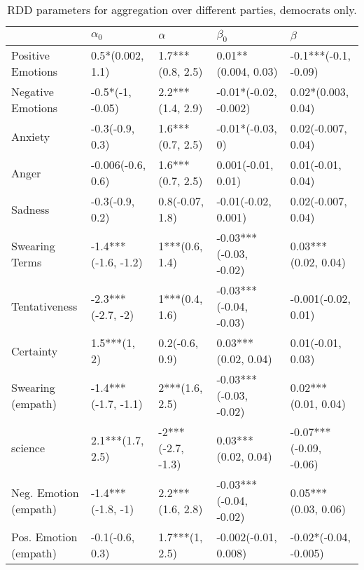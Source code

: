 \begin{table}[h]\centering
\begin{adjustbox}{width=\linewidth, center}
	\begin{tabular}{lllll}
	\toprule
	{} &           $\alpha_0$ &           $\alpha$ &               $\beta_0$ &                 $\beta$ \\
	\midrule
	Positive Emotions     &     0.5*(0.002, 1.1) &   1.7***(0.8, 2.5) &     0.01**(0.004, 0.03) &    -0.1***(-0.1, -0.09) \\
	Negative Emotions     &     -0.5*(-1, -0.05) &   2.2***(1.4, 2.9) &   -0.01*(-0.02, -0.002) &      0.02*(0.003, 0.04) \\
	Anxiety               &      -0.3(-0.9, 0.3) &   1.6***(0.7, 2.5) &        -0.01*(-0.03, 0) &      0.02(-0.007, 0.04) \\
	Anger                 &    -0.006(-0.6, 0.6) &   1.6***(0.7, 2.5) &      0.001(-0.01, 0.01) &       0.01(-0.01, 0.04) \\
	Sadness               &      -0.3(-0.9, 0.2) &    0.8(-0.07, 1.8) &     -0.01(-0.02, 0.001) &      0.02(-0.007, 0.04) \\
	Swearing Terms        &  -1.4***(-1.6, -1.2) &     1***(0.6, 1.4) &  -0.03***(-0.03, -0.02) &     0.03***(0.02, 0.04) \\
	Tentativeness         &    -2.3***(-2.7, -2) &     1***(0.4, 1.6) &  -0.03***(-0.04, -0.03) &     -0.001(-0.02, 0.01) \\
	Certainty             &         1.5***(1, 2) &     0.2(-0.6, 0.9) &     0.03***(0.02, 0.04) &       0.01(-0.01, 0.03) \\
	Swearing (empath)     &  -1.4***(-1.7, -1.1) &     2***(1.6, 2.5) &  -0.03***(-0.03, -0.02) &     0.02***(0.01, 0.04) \\
	science               &     2.1***(1.7, 2.5) &  -2***(-2.7, -1.3) &     0.03***(0.02, 0.04) &  -0.07***(-0.09, -0.06) \\
	Neg. Emotion (empath) &    -1.4***(-1.8, -1) &   2.2***(1.6, 2.8) &  -0.03***(-0.04, -0.02) &     0.05***(0.03, 0.06) \\
	Pos. Emotion (empath) &      -0.1(-0.6, 0.3) &     1.7***(1, 2.5) &    -0.002(-0.01, 0.008) &   -0.02*(-0.04, -0.005) \\
	\bottomrule
	\end{tabular}
	
\end{adjustbox}
	\caption{RDD parameters for aggregation over different parties, democrats only.}
	\label{fig: Party_1}
\end{table}

